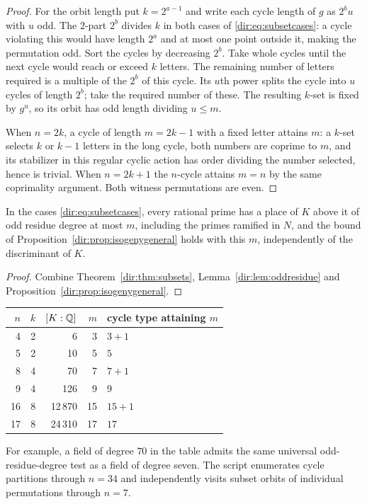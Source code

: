 \begin{proof}
For the orbit length put $k=2^{a-1}$ and write each cycle length of $g$ as $2^bu$ with
$u$ odd. The $2$-part $2^b$ divides $k$ in both cases of \eqref{dir:eq:subsetcases}:
a cycle violating this would have length $2^a$ and at most one point outside it,
making the permutation odd. Sort the cycles by decreasing $2^b$. Take whole cycles
until the next cycle would reach or exceed $k$ letters. The remaining number of
letters required is a multiple of the $2^b$ of this cycle. Its $u$th power splits the
cycle into $u$ cycles of length $2^b$; take the required number of these. The
resulting $k$-set is fixed by $g^u$, so its orbit has odd length dividing $u\le m$.

When $n=2k$, a cycle of length $m=2k-1$ with a fixed letter attains $m$: a $k$-set
selects $k$ or $k-1$ letters in the long cycle, both numbers are coprime to $m$, and
its stabilizer in this regular cyclic action has order dividing the number selected,
hence is trivial. When $n=2k+1$ the $n$-cycle attains $m=n$ by the same coprimality
argument. Both witness permutations are even.
\end{proof}

\begin{corollary}
\label{dir:cor:subsets}
In the cases \eqref{dir:eq:subsetcases}, every rational prime has a place of $K$ above
it of odd residue degree at most $m$, including the primes ramified in $N$, and the
bound of Proposition~\ref{dir:prop:isogenygeneral} holds with this $m$, independently of the
discriminant of $K$.
\end{corollary}

\begin{proof}
Combine Theorem~\ref{dir:thm:subsets}, Lemma~\ref{dir:lem:oddresidue} and Proposition~\ref{dir:prop:isogenygeneral}.
\end{proof}

\begin{center}
\begin{tabular}{rrrrl}
\toprule
$n$ & $k$ & $[K:\mathbb{Q}]$ & $m$ & cycle type attaining $m$\\
\midrule
4 & 2 & 6 & 3 & $3+1$\\
5 & 2 & 10 & 5 & $5$\\
8 & 4 & 70 & 7 & $7+1$\\
9 & 4 & 126 & 9 & $9$\\
16 & 8 & 12\,870 & 15 & $15+1$\\
17 & 8 & 24\,310 & 17 & $17$\\
\bottomrule
\end{tabular}
\end{center}
For example, a field of degree $70$ in the table admits the same universal
odd-residue-degree test as a field of degree seven. The script
 enumerates cycle partitions
through $n=34$ and independently visits subset orbits of individual permutations
through $n=7$.

